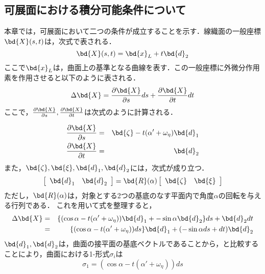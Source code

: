 	\subsection{可展面における積分可能条件について}
		本章では，可展面において二つの条件が成立することを示す．線織面の一般座標$ \bd{X}(s,t) $は，次式で表される．
		\begin{equation}\label{eq:GeneralPos_RuledSurface}
			\bd{X}(s,t) = \bd{x}_L + t \bd{d}_2
		\end{equation}
		ここで$ \bd{x}_L $は，曲面上の基準となる曲線を表す．この一般座標に外微分作用素を作用させると以下のように表される．
		\begin{equation}\label{eq:TotalDiff_Pos0}
			\Delta \bd{X} = \frac{\partial \bd{X}}{\partial s} ds + \frac{\partial \bd{X}}{\partial t} dt
		\end{equation}
		ここで，$ \frac{\partial \bd{X}}{\partial s},\frac{\partial \bd{X}}{\partial t} $は次式のように計算される．
		
		\begin{eqnarray}
			 \frac{\partial \bd{X}}{\partial s} &=& \bd{\zeta} -t(\alpha' + \omega_{\eta}) \bd{d}_1 \\
			 \frac{\partial \bd{X}}{\partial t} &=& \bd{d}_2
		\end{eqnarray}
		また，$ \bd{\zeta} ,\bd{\xi},\bd{d}_1,\bd{d}_2$には，次式が成り立つ．
		\begin{equation}\label{eq:RelationD1D2}	
			\left[
			\begin{array}{cc}
			\bd{d}_1 & \bd{d}_2
			\end{array}
			\right] = \bd{R}(\alpha) 	\left[
			\begin{array}{cc}
			\bd{\zeta} & \bd{\xi}
			\end{array}
			\right]
		\end{equation}
		ただし，$ \bd{R}(\alpha) $は，対象とする2つの基底のなす平面内で角度$ \alpha $の回転を与える行列である．
		これを用いて式を整理すると，
		\begin{eqnarray}\label{eq:DiffEq}
			\Delta \bd{X} &=& \{ (\cos \alpha - t(\alpha' + \omega_{\eta}) ) \bd{d}_1 + -\sin \alpha \bd{d}_2 \}ds + \bd{d}_2 dt \\
			&=& \{  (\cos \alpha - t(\alpha' + \omega_{\eta}) )ds \} \bd{d}_1 + (-\sin \alpha ds + dt) \bd{d}_2 
		\end{eqnarray}
		$ \bd{d}_1,\bd{d}_2$は，曲面の接平面の基底ベクトルであることから，と比較することにより，曲面における1-形式$ \sigma_i $は
		\begin{equation}\label{eq:Dev_sigmaEq_s}
			\sigma_1 = (\cos \alpha - t(\alpha' + \omega_{\eta}) )ds
		\end{equation}
		
